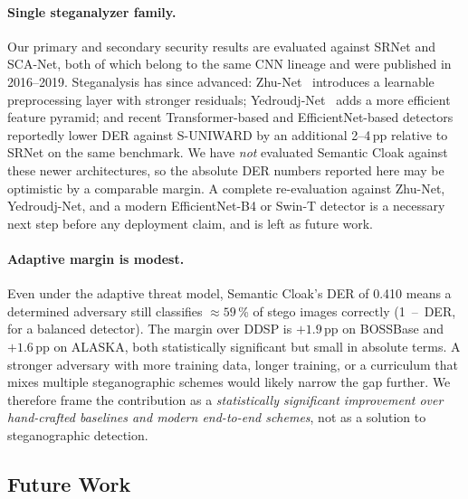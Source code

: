 \documentclass[10pt,a4paper]{article}
\begin{document}
\paragraph{Single steganalyzer family.} Our primary and secondary
security results are evaluated against SRNet and SCA-Net, both of
which belong to the same CNN lineage and were published in 2016--2019.
Steganalysis has since advanced: Zhu-Net~\cite{zhu2024zhunet}
introduces a learnable preprocessing layer with stronger residuals;
Yedroudj-Net~\cite{yedroudj2018yedroudjnet} adds a more efficient
feature pyramid; and recent Transformer-based and
EfficientNet-based detectors~\cite{you2021vitsteg} reportedly lower
DER against S-UNIWARD by an additional 2--4\,pp relative to SRNet on
the same benchmark. We have \emph{not} evaluated Semantic Cloak
against these newer architectures, so the absolute DER numbers
reported here may be optimistic by a comparable margin. A complete
re-evaluation against Zhu-Net, Yedroudj-Net, and a modern
EfficientNet-B4 or Swin-T detector is a necessary next step before
any deployment claim, and is left as future work.

\paragraph{Adaptive margin is modest.} Even under the adaptive
threat model, Semantic Cloak's DER of 0.410 means a determined
adversary still classifies $\approx 59$\,\% of stego images correctly
(1~--~DER, for a balanced detector). The margin over DDSP is
$+1.9$\,pp on BOSSBase and $+1.6$\,pp on ALASKA, both statistically
significant but small in absolute terms. A stronger adversary with
more training data, longer training, or a curriculum that mixes
multiple steganographic schemes would likely narrow the gap further.
We therefore frame the contribution as a \emph{statistically
significant improvement over hand-crafted baselines and modern
end-to-end schemes}, not as a solution to steganographic detection.

\subsection{Future Work}
\label{sec:disc-future}
\end{document}
